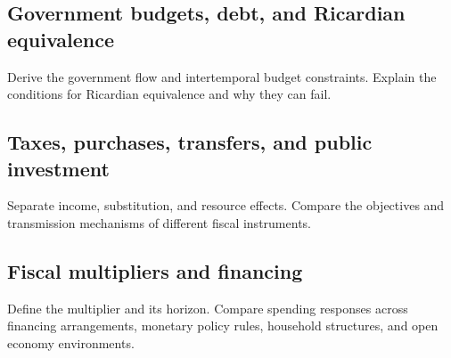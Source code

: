 \label{sec:fiscal-policy}

\subsection{Government budgets, debt, and Ricardian equivalence}
Derive the government flow and intertemporal budget constraints. Explain the
conditions for Ricardian equivalence and why they can fail.

\subsection{Taxes, purchases, transfers, and public investment}
Separate income, substitution, and resource effects. Compare the objectives
and transmission mechanisms of different fiscal instruments.

\subsection{Fiscal multipliers and financing}
Define the multiplier and its horizon. Compare spending responses across
financing arrangements, monetary policy rules, household structures, and
open economy environments.
